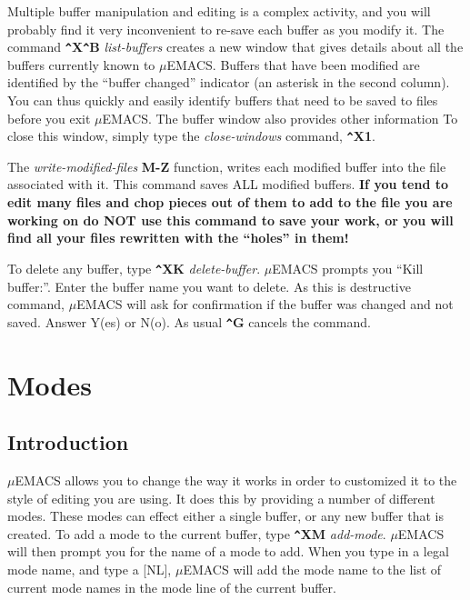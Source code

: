 Multiple buffer manipulation and editing is a complex activity, and you
will probably find it very inconvenient to re-save each buffer as you
modify it. The command {\bf \verb+^+X\verb+^+B} {\it list-buffers}
creates a new window that gives details about all the buffers currently
known to $\mu$EMACS. Buffers that have been modified are identified by the
``buffer changed'' indicator (an asterisk in the second column). You can
thus quickly and easily identify buffers that need to be saved to files
before you exit $\mu$EMACS. The buffer window also provides other
information To close this window, simply type the {\it close-windows}
command, {\bf \verb+^+X1}.

The {\it write-modified-files} {\bf M-Z} function, writes each modified
buffer into the file associated with it. This command saves ALL
modified buffers. {\bf If you tend to edit many files and chop pieces
out of them to add to the file you are working on do NOT use this
command to save your work, or you will find all your files rewritten
with the ``holes'' in them!}

To delete any buffer, type {\bf \verb+^+XK} {\it delete-buffer}.
$\mu$EMACS prompts you ``Kill buffer:''. Enter the buffer name you want
to delete. As this is destructive command, $\mu$EMACS will ask for
confirmation if the buffer was changed and not saved. Answer Y(es) or
N(o). As usual {\bf \verb+^+G} cancels the command.
\chapter{Modes}

\section{Introduction}

$\mu$EMACS allows you to change the way it works in order to customized
it to the style of editing you are using. It does this by providing a
number of different modes. These modes can effect either a single
buffer, or any new buffer that is created. To add a mode to the current
buffer, type {\bf \verb+^+XM} {\it add-mode}. $\mu$EMACS will then
prompt you for the name of a mode to add. When you type in a legal mode
name, and type a [NL], $\mu$EMACS will add the mode name to the list of
current mode names in the mode line of the current buffer.

